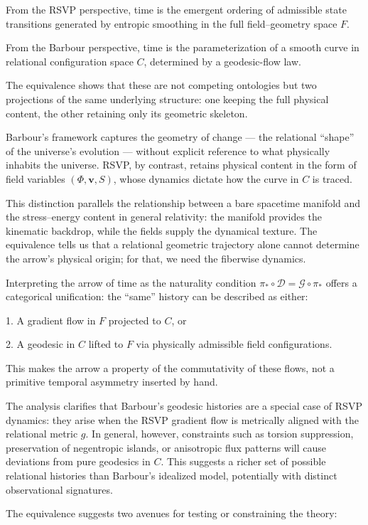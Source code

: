 \documentclass[11pt]{article}
\theoremstyle{plain}
\theoremstyle{definition}
\begin{document}
From the RSVP perspective, time is the emergent ordering of admissible state transitions generated by entropic smoothing in the full field–geometry space $F$.

From the Barbour perspective, time is the parameterization of a smooth curve in relational configuration space $C$, determined by a geodesic-flow law.

The equivalence shows that these are not competing ontologies but two projections of the same underlying structure: one keeping the full physical content, the other retaining only its geometric skeleton.

Barbour’s framework captures the geometry of change — the relational “shape” of the universe’s evolution — without explicit reference to what physically inhabits the universe. RSVP, by contrast, retains physical content in the form of field variables $(\Phi, \mathbf{v}, S)$, whose dynamics dictate how the curve in $C$ is traced.

This distinction parallels the relationship between a bare spacetime manifold and the stress–energy content in general relativity: the manifold provides the kinematic backdrop, while the fields supply the dynamical texture. The equivalence tells us that a relational geometric trajectory alone cannot determine the arrow’s physical origin; for that, we need the fiberwise dynamics.

Interpreting the arrow of time as the naturality condition
$\pi_* \circ \mathcal{D} = \mathcal{G} \circ \pi_*$
offers a categorical unification: the “same” history can be described as either:

1. A gradient flow in $F$ projected to $C$, or

2. A geodesic in $C$ lifted to $F$ via physically admissible field configurations.

This makes the arrow a property of the commutativity of these flows, not a primitive temporal asymmetry inserted by hand.

The analysis clarifies that Barbour’s geodesic histories are a special case of RSVP dynamics: they arise when the RSVP gradient flow is metrically aligned with the relational metric $g$. In general, however, constraints such as torsion suppression, preservation of negentropic islands, or anisotropic flux patterns will cause deviations from pure geodesics in $C$. This suggests a richer set of possible relational histories than Barbour’s idealized model, potentially with distinct observational signatures.

The equivalence suggests two avenues for testing or constraining the theory:
\end{document}
